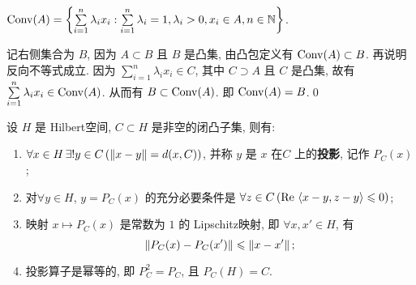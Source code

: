     \begin{Proposition}
        $ \operatorname{Conv}(A)=\left\{ \sum\limits_{i=1}^{n}\lambda_{i}x_{i}:\sum\limits_{i=1}^{n}\lambda_{i}=1, \lambda_{i}>0, x_{i}\in A, n\in \mathbb{N} \right\} $.
    \end{Proposition}

    \begin{Proof}
        记右侧集合为 $ B $, 因为 $ A\subset B $ 且 $ B $ 是凸集, 由凸包定义有 $ \operatorname{Conv}(A)\subset B $. 再说明反向不等式成立. 因为 $ \sum\limits_{i=1}^{n}\lambda_{i}x_{i}\in C $, 其中 $ C\supset A $ 且 $ C $ 是凸集, 故有 $ \sum\limits_{i=1}^{n}\lambda_{i}x_{i}\in\operatorname{Conv}(A) $. 从而有 $ B\subset\operatorname{Conv}(A) $. 即 $ \operatorname{Conv}(A)=B $.\qed
    \end{Proof}

    \begin{Theorem}[闭凸集投影定理]\label{thm:闭凸集投影定理}
        设 $ H $ 是 Hilbert空间, $ C\subset H $ 是非空的闭凸子集, 则有:
        \begin{enumerate}[(1)]
            \item $ \forall x\in H\,\exists!y\in C\,(\left\| x-y \right\|=d(x, C)) $, 并称 $ y $ 是 $ x $ 在$ C $ 上的\textbf{投影}, 记作 $ P_{C}(x) $;
            \item 对$ \forall y\in H $, $ y=P_{C}(x) $ 的充分必要条件是 $ \forall z\in C\,(\mathrm{Re\,}\left\langle x-y, z-y \right\rangle\leqslant0) $;
            \item 映射 $ x\mapsto P_{C}(x) $ 是常数为 $ 1 $ 的 Lipschitz映射, 即 $ \forall x, x'\in H $, 有
            \[
                \left\| P_{C}(x)-P_{C}(x') \right\|\leqslant \left\| x-x' \right\|;
            \]
            \item 投影算子是幂等的, 即 $ P^{2}_{C}=P_{C} $, 且 $ P_{C}(H)=C $.
        \end{enumerate}
    \end{Theorem}

